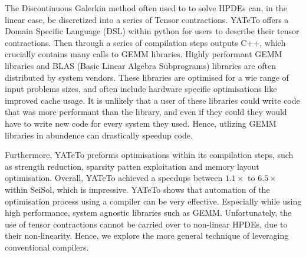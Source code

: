 The Discontinuous Galerkin method often used to to solve HPDEs can, in the linear case, be discretized into a series of Tensor contractions.
YATeTo offers a Domain Specific Language (DSL) within python for users to describe their tensor contractions.
Then through a series of compilation steps outputs C++, which crucially contains many calls to GEMM libraries.
Highly performant GEMM libraries and BLAS (Basic Linear Algebra Subprograms) libraries are often distributed by system vendors.
These libraries are optimised for a wie range of input problems sizes, and often include hardware specific optimisations like improved cache usage.
It is unlikely that a user of these libraries could write code that was more performant than the library, and even if they could they would have to write new code for every system they used.
Hence, utlizing GEMM libraries in abundence can drastically speedup code.

Furthermore, YATeTo preforms optimisations within its compilation steps, such as strength reduction, sparsity patten exploitation and memory layout optimisation.
Overall, YATeTo achieved a speedups between $1.1\times$ to $6.5 \times$ within SeiSol, which is impressive.
YATeTo shows that automation of the optimisation process using a compiler can be very effective.
Especially while using high performance, system agnostic libraries such as GEMM.
Unfortunately, the use of tensor contractions cannot be carried over to non-linear HPDEs, due to their non-linearity.
Hence, we explore the more general technique of leveraging conventional compilers.   




\cite{FiredrakeAndCOFFEE}


\cite{codegen_dg_SIMD}

